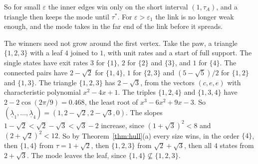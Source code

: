 So for small $\varepsilon$ the inner edges win only on the short interval
$(1,\tau_A)$, and a triangle then keeps the mode until $\tau^*$. For
$\varepsilon>\varepsilon_1$ the link is no longer weak enough, and the mode takes
in the far end of the link before it spreads.

\begin{remark}\label{rem:nonnested}
The winners need not grow around the first vertex. Take the paw, a triangle
$\{1,2,3\}$ with a leaf $4$ joined to $1$, with unit rates and a start of full
support. The single states have exit rates $3$ for $\{1\}$, $2$ for $\{2\}$
and $\{3\}$, and $1$ for $\{4\}$. The connected pairs have $2-\sqrt2$ for
$\{1,4\}$, $1$ for $\{2,3\}$ and $(5-\sqrt5)/2$ for $\{1,2\}$ and $\{1,3\}$.
The triangle $\{1,2,3\}$ has $2-\sqrt3$, from the vectors $(c,e,e)$ with
characteristic polynomial $x^2-4x+1$. The triples $\{1,2,4\}$ and
$\{1,3,4\}$ have $2-2\cos(2\pi/9)=0.468$, the least root of
$x^3-6x^2+9x-3$. So
$(\underline\lambda_1,\dots,\underline\lambda_4)=(1,2-\sqrt2,2-\sqrt3,0)$. The
slopes $1-\sqrt2<\sqrt2-\sqrt3<\sqrt3-2$ increase, since $(1+\sqrt3)^2<8$ and
$(2+\sqrt2)^2<12$. So by Theorem~\ref{thm:hull}(a) every size wins, in the
order $\{4\}$, then $\{1,4\}$ from $\tau=1+\sqrt2$, then $\{1,2,3\}$ from
$\sqrt2+\sqrt3$, then all $4$ states from $2+\sqrt3$. The mode leaves the
leaf, since $\{1,4\}\not\subseteq\{1,2,3\}$.
\end{remark}
